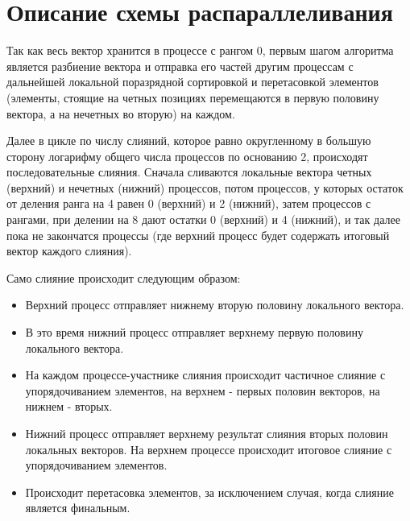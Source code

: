 \documentclass{report}
\begin{document}
	\section*{Описание схемы распараллеливания}
	Так как весь вектор хранится в процессе с рангом 0, первым шагом алгоритма является разбиение вектора и отправка его частей другим процессам с дальнейшей локальной поразрядной сортировкой и перетасовкой элементов (элементы, стоящие на четных позициях перемещаются в первую половину вектора, а на нечетных во вторую) на каждом. 
	\par Далее в цикле по числу слияний, которое равно округленному в большую сторону логарифму общего числа процессов по основанию 2, происходят последовательные слияния. Сначала сливаются локальные вектора четных (верхний) и нечетных (нижний) процессов, потом процессов, у которых остаток от деления ранга на 4 равен 0 (верхний) и 2 (нижний), затем процессов с рангами, при делении на 8 дают остатки 0 (верхний) и 4 (нижний), и так далее пока не закончатся процессы (где верхний процесс будет содержать итоговый вектор каждого слияния).
	\par Само слияние происходит следующим образом:
	\begin{itemize}
		\item Верхний процесс отправляет нижнему вторую половину локального вектора.
		\item В это время нижний процесс отправляет верхнему первую половину локального вектора.
		\item На каждом процессе-участнике слияния происходит частичное слияние с упорядочиванием элементов, на верхнем - первых половин векторов, на нижнем - вторых.
		\item Нижний процесс отправляет верхнему результат слияния вторых половин локальных векторов. На верхнем процессе происходит итоговое слияние с упорядочиванием элементов.
		\item Происходит перетасовка элементов, за исключением случая, когда слияние является финальным.
	\end{itemize}
	\newpage
	
\end{document}
